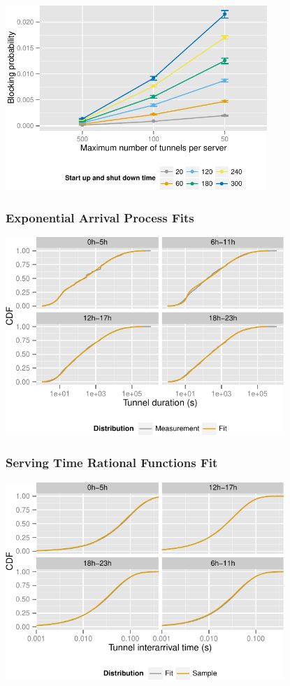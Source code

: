 \documentclass{beamer}
\begin{document}
\begin{frame}
	\frametitle{}
	\begin{center}
		\includegraphics[height=7cm]{figures/compare-maxinstances-block.pdf}
	\end{center}
\end{frame}


\begin{frame}
	\frametitle{Exponential Arrival Process Fits}

	\begin{center}
		\includegraphics[height=7.5cm]{figures/timeslot-fits.pdf}
	\end{center}
\end{frame}

\begin{frame}
	\frametitle{Serving Time Rational Functions Fit}

	\begin{center}
		\includegraphics[height=7.5cm]{figures/R-IAT-active-fit-cdf-facets.pdf}
	\end{center}
\end{frame}
\end{document}
